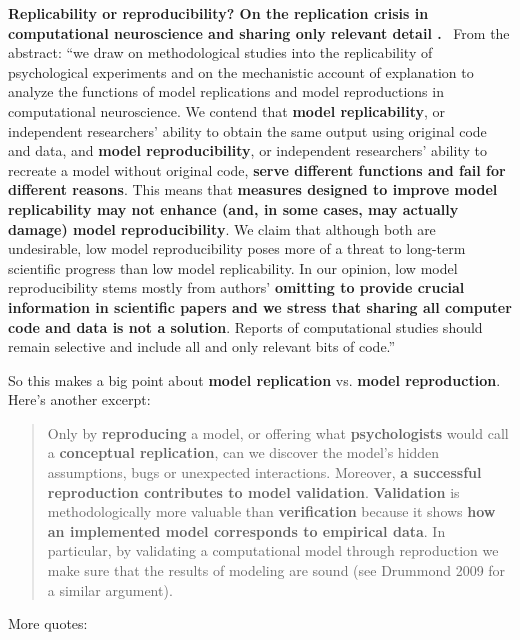 \documentclass[sigconf,screen,nonacm]{acmart}
\newcommand{\mypara}[1]{\vspace{6pt}\noindent\textbf{#1}~}
\begin{document}
\mypara{Replicability or reproducibility? On the replication crisis in
  computational neuroscience and sharing only relevant detail
  \cite{milkowski2018replicability}.} From the abstract: ``we draw on
methodological studies into the replicability of psychological
experiments and on the mechanistic account of explanation to analyze
the functions of model replications and model reproductions in
computational neuroscience. We contend that \textbf{model
  replicability}, or independent researchers' ability to obtain the
same output using original code and data, and \textbf{model
  reproducibility}, or independent researchers' ability to recreate a
model without original code, \textbf{serve different functions and
  fail for different reasons}. This means that \textbf{measures
  designed to improve model replicability may not enhance (and, in
  some cases, may actually damage) model reproducibility}. We claim
that although both are undesirable, low model reproducibility poses
more of a threat to long-term scientific progress than low model
replicability. In our opinion, low model reproducibility stems mostly
from authors' \textbf{omitting to provide crucial information in
  scientific papers and we stress that sharing all computer code and
  data is not a solution}. Reports of computational studies should
remain selective and include all and only relevant bits of code.''
 
So this makes a big point about \textbf{model replication}
vs. \textbf{model reproduction}. Here's another excerpt: 
\begin{quote}
Only by
\textbf{reproducing} a model, or offering what \textbf{psychologists}
would call a \textbf{conceptual replication}, can we discover the
model's hidden assumptions, bugs or unexpected interactions. Moreover,
\textbf{a successful reproduction contributes to model
  validation}. \textbf{Validation} is methodologically more valuable
than \textbf{verification} because it shows\textbf{ how an implemented
  model corresponds to empirical data}. In particular, by validating a
computational model through reproduction we make sure that the results
of modeling are sound (see Drummond 2009 for a similar argument).
\end{quote}

More quotes:
\end{document}
